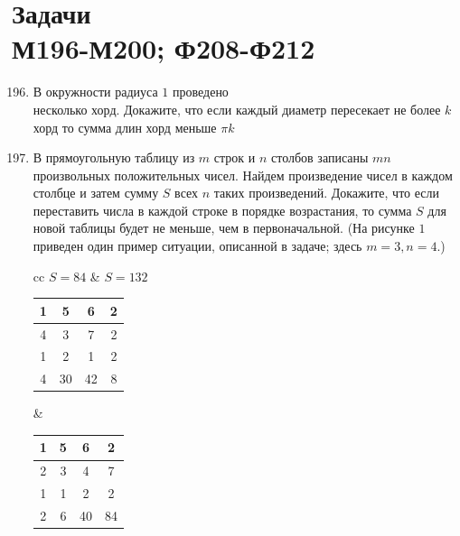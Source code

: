 \section*{Задачи \\ М196-М200; Ф208-Ф212}

 \begin{enumerate}[font=\bfseries, wide,  labelindent=0pt, noitemsep]
    \setcounter{enumi}{195}
    \item В окружности радиуса $1$ проведено \\ несколько хорд. Докажите, что если каждый диаметр пересекает не более $k$ хорд то сумма длин хорд меньше $\pi k$ \\
    \item В прямоугольную таблицу из $m$ строк и $n$ столбов записаны $mn$ произвольных положительных чисел. Найдем произведение чисел в каждом столбце и затем сумму $S$ всех $n$ таких произведений. Докажите, что если переставить числа в каждой строке в порядке возрастания, то сумма $S$ для новой таблицы будет не меньше, чем в первоначальной. (На рисунке $1$ приведен один пример ситуации, описанной в задаче; здесь $m = 3, n = 4$.) \par
    \begin{tabular}{ cc }   %
$S = 84$ & $S = 132$ \\  
\begin{tabular}{ |c|c|c|c| } 
 \hline
 1 & 5 & 6 & 2\\
 \hline
 4 & 3 & 7 & 2\\
 \hline
 1 & 2 & 1 & 2\\
 \hline
  
 \hline
 4 & 30 & 42 & 8\\
 \hline
\end{tabular} &  %
\begin{tabular}{ |c|c|c|c| } 
 \hline
 1 & 5 & 6 & 2\\
 \hline
 2 & 3 & 4 & 7\\
 \hline
 1 & 1 & 2 & 2\\
 \hline
  
 \hline
 2 & 6 & 40 & 84\\
 \hline
\end{tabular} \\
\end{tabular} \\


\end{enumerate}
